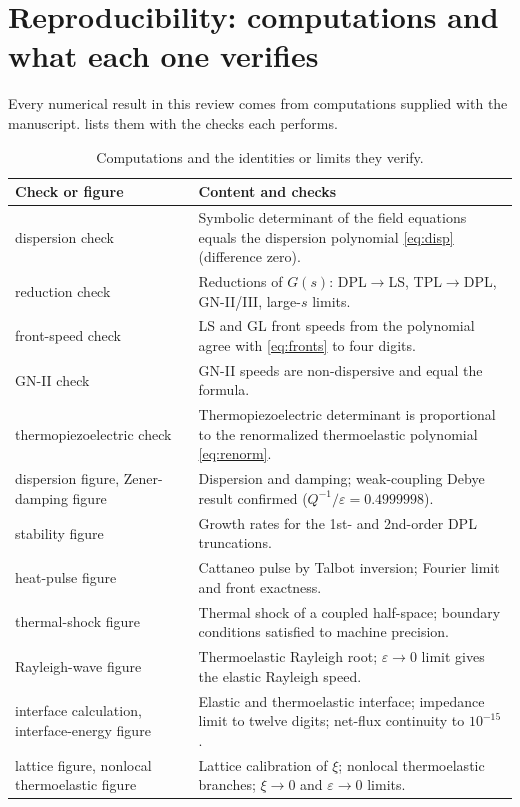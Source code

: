 \section{Reproducibility: computations and what each one verifies}\label{app:repro}
Every numerical result in this review comes from computations supplied with the manuscript.  lists them with the checks each performs.
\begin{table}[H]\centering\footnotesize
\caption{Computations and the identities or limits they verify.}\label{tab:scripts}
\begin{tabularx}{\textwidth}{@{}p{5.2cm}X@{}}\toprule
Check or figure & Content and checks\\\midrule
dispersion check & Symbolic determinant of the field equations equals the dispersion polynomial \eqref{eq:disp} (difference zero).\\
reduction check & Reductions of $G(s)$: DPL$\to$LS, TPL$\to$DPL, GN-II/III, large-$s$ limits.\\
front-speed check & LS and GL front speeds from the polynomial agree with \eqref{eq:fronts} to four digits.\\
GN-II check & GN-II speeds are non-dispersive and equal the formula.\\
thermopiezoelectric check & Thermopiezoelectric determinant is proportional to the renormalized thermoelastic polynomial \eqref{eq:renorm}.\\
dispersion figure, Zener-damping figure & Dispersion and damping; weak-coupling Debye result confirmed ($Q^{-1}/\varepsilon=0.4999998$).\\
stability figure & Growth rates for the 1st- and 2nd-order DPL truncations.\\
heat-pulse figure & Cattaneo pulse by Talbot inversion; Fourier limit and front exactness.\\
thermal-shock figure & Thermal shock of a coupled half-space; boundary conditions satisfied to machine precision.\\
Rayleigh-wave figure & Thermoelastic Rayleigh root; $\varepsilon\to0$ limit gives the elastic Rayleigh speed.\\
interface calculation, interface-energy figure & Elastic and thermoelastic interface; impedance limit to twelve digits; net-flux continuity to $10^{-15}$.\\
lattice figure, nonlocal thermoelastic figure & Lattice calibration of $\xi$; nonlocal thermoelastic branches; $\xi\to0$ and $\varepsilon\to0$ limits.\\

\end{tabularx}
\end{table}
